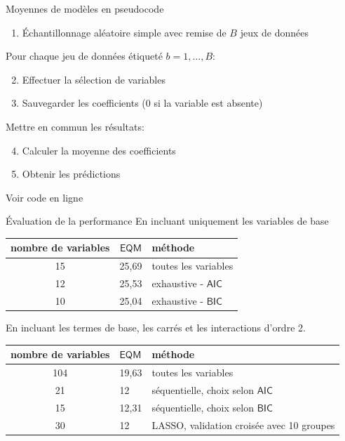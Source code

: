 \documentclass[
  ignorenonframetext,
]{beamer}
\providecommand{\tightlist}{%
  \setlength{\itemsep}{0pt}\setlength{\parskip}{0pt}}\usepackage{longtable,booktabs,array}
\begin{document}
\begin{frame}{Moyennes de modèles en pseudocode}
\protect\hypertarget{moyennes-de-moduxe8les-en-pseudocode}{}
\begin{enumerate}
\tightlist
\item
  Échantillonnage aléatoire simple avec remise de \(B\) jeux de données
\end{enumerate}

Pour chaque jeu de données étiqueté \(b=1, \ldots, B\):

\begin{enumerate}
\setcounter{enumi}{1}
\tightlist
\item
  Effectuer la sélection de variables
\item
  Sauvegarder les coefficients (0 si la variable est absente)
\end{enumerate}

Mettre en commun les résultats:

\begin{enumerate}
\setcounter{enumi}{3}
\tightlist
\item
  Calculer la moyenne des coefficients
\item
  Obtenir les prédictions
\end{enumerate}

\footnotesize

Voir code en ligne

\normalsize
\end{frame}

\begin{frame}{Évaluation de la performance}
\protect\hypertarget{uxe9valuation-de-la-performance}{}
En incluant uniquement les variables de base

\begin{longtable}[]{@{}ccl@{}}
\toprule()
nombre de variables & \(\mathsf{EQM}\) & méthode \\
\midrule()
\endhead
15 & 25,69 & toutes les variables \\
12 & 25,53 & exhaustive - \(\mathsf{AIC}\) \\
10 & 25,04 & exhaustive - \(\mathsf{BIC}\) \\
\bottomrule()
\end{longtable}

En incluant les termes de base, les carrés et les interactions d'ordre
2.

\begin{longtable}[]{@{}cll@{}}
\toprule()
nombre de variables & \(\mathsf{EQM}\) & méthode \\
\midrule()
\endhead
104 & 19,63 & toutes les variables \\
21 & 12 & séquentielle, choix selon \(\mathsf{AIC}\) \\
15 & 12,31 & séquentielle, choix selon \(\mathsf{BIC}\) \\
30 & 12 & LASSO, validation croisée avec 10 groupes \\
\bottomrule()
\end{longtable}
\end{frame}
\end{document}
